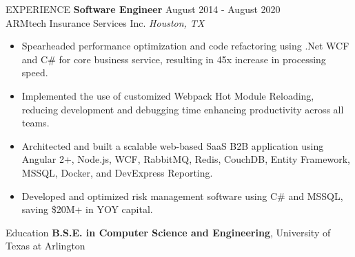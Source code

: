\documentclass{basecv}
\begin{document}
\begin{rSection}{EXPERIENCE}
    \textbf{Software Engineer} \hfill August 2014 - August 2020\\
    ARMtech Insurance Services Inc. \hfill \textit{Houston, TX}
    \begin{itemize}
        \itemsep -3pt {}
        \item Spearheaded performance optimization and code refactoring using .Net WCF and C\# for core business service, resulting in 45x increase in processing speed.
        \item Implemented the use of customized Webpack Hot Module Reloading, reducing development and debugging time enhancing productivity across all teams.
        \item Architected and built a scalable web-based SaaS B2B application using Angular 2+, Node.js, WCF, RabbitMQ, Redis, CouchDB, Entity Framework, MSSQL, Docker, and DevExpress Reporting.
        \item Developed and optimized risk management software using C\# and MSSQL, saving \$20M+ in YOY capital.
    \end{itemize}

\end{rSection}

\begin{rSection}{Education}
    {\bf B.S.E. in Computer Science and Engineering}, University of Texas at Arlington
\end{rSection}

\end{document}
